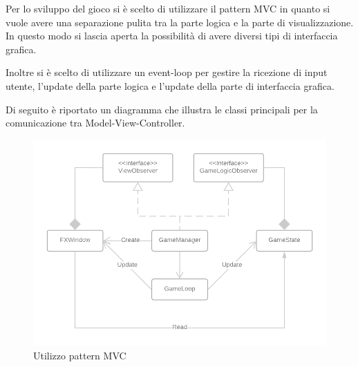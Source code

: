 Per lo sviluppo del gioco si è scelto di utilizzare il pattern MVC in quanto si vuole avere una separazione pulita tra la parte logica e la parte di visualizzazione. In questo modo si lascia aperta la possibilità di avere diversi tipi di interfaccia grafica.

Inoltre si è scelto di utilizzare un event-loop per gestire la ricezione di input utente, l'update della parte logica e l'update della parte di interfaccia grafica. 

Di seguito è riportato un diagramma che illustra le classi principali per la comunicazione tra Model-View-Controller.

\begin{figure}[H]
  \includegraphics[width=15cm]{report/res/MVC_Diagram.png}
  \caption{Utilizzo pattern MVC}
\end{figure}